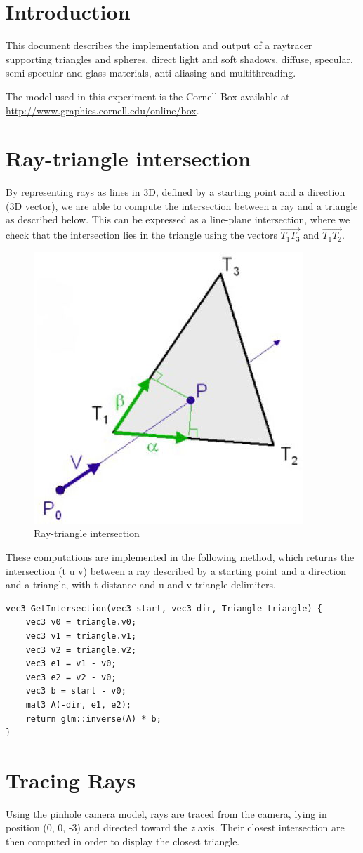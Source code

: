 \section*{Introduction}
This document describes the implementation and output of a raytracer supporting triangles and spheres, direct light and soft shadows, diffuse, specular, semi-specular and glass materials, anti-aliasing and multithreading.

The model used in this experiment is the Cornell Box available at \url{http://www.graphics.cornell.edu/online/box}.

\setcounter{section}{0}

\section{Ray-triangle intersection}
By representing rays as lines in 3D, defined by a starting point and a direction (3D vector), we are able to compute the intersection between a ray and a triangle as described below.
This can be expressed as a line-plane intersection, where we check that the intersection lies in the triangle using the vectors $\vec{T_1T_3}$ and $\vec{T_1T_2}$.

\begin{figure}[H]
\centering
\includegraphics[width=0.2\linewidth]{img/ray.jpg}
\caption{Ray-triangle intersection}
\end{figure}

These computations are implemented in the following method, which returns the intersection (t u v) between a ray described by a starting point and a direction and a triangle, with t distance and u and v triangle delimiters.
\begin{lstlisting}
vec3 GetIntersection(vec3 start, vec3 dir, Triangle triangle) {
	vec3 v0 = triangle.v0;
	vec3 v1 = triangle.v1;
	vec3 v2 = triangle.v2;
	vec3 e1 = v1 - v0;
	vec3 e2 = v2 - v0;
	vec3 b = start - v0;
	mat3 A(-dir, e1, e2);
	return glm::inverse(A) * b;
}
\end{lstlisting}


\section{Tracing Rays}
Using the pinhole camera model, rays are traced from the camera, lying in position (0, 0, -3) and directed toward the \textit{z} axis. Their closest intersection are then computed in order to display the closest triangle.

